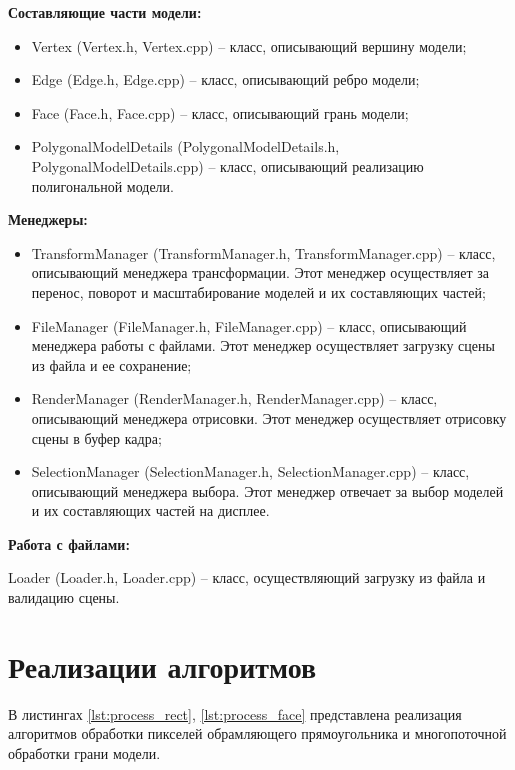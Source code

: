 \textbf{Составляющие части модели:}
\begin{itemize}[label=---]
\item Vertex (Vertex.h, Vertex.cpp) – класс, описывающий вершину модели;
\item Edge (Edge.h, Edge.cpp) – класс, описывающий ребро модели;
\item Face (Face.h, Face.cpp) – класс, описывающий грань модели;
\item PolygonalModelDetails (PolygonalModelDetails.h, PolygonalModelDetails.cpp) – класс, описывающий реализацию полигональной модели.
\end{itemize}

\textbf{Менеджеры:}
\begin{itemize}[label=---]
\item TransformManager (TransformManager.h, TransformManager.cpp) – класс, описывающий менеджера трансформации. Этот менеджер осуществляет за перенос, поворот и масштабирование моделей и их составляющих частей;
\item FileManager (FileManager.h, FileManager.cpp) – класс, описывающий менеджера работы с файлами. Этот менеджер осуществляет загрузку сцены из файла и ее сохранение;
\item RenderManager (RenderManager.h, RenderManager.cpp) – класс, описывающий менеджера отрисовки. Этот менеджер осуществляет отрисовку сцены в буфер кадра;
\item SelectionManager (SelectionManager.h, SelectionManager.cpp) – класс, описывающий менеджера выбора. Этот менеджер отвечает за выбор моделей и их составляющих частей на дисплее.
\end{itemize}

\textbf{Работа с файлами:} 

Loader (Loader.h, Loader.cpp) – класс, осуществляющий загрузку из файла и валидацию сцены.

\section{Реализации алгоритмов}

В листингах \ref{lst:process_rect}, \ref{lst:process_face} представлена реализация алгоритмов обработки пикселей обрамляющего прямоугольника и многопоточной обработки грани модели.\clearpage

